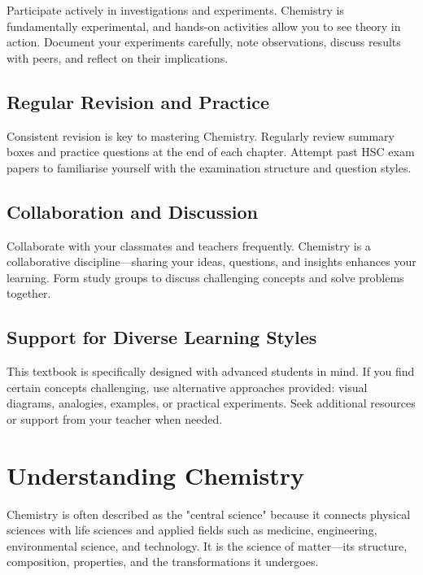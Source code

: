 Participate actively in investigations and experiments. Chemistry is fundamentally experimental, and hands-on activities allow you to see theory in action. Document your experiments carefully, note observations, discuss results with peers, and reflect on their implications.

\subsection{Regular Revision and Practice}
\FloatBarrier
\FloatBarrier
\FloatBarrier

Consistent revision is key to mastering Chemistry. Regularly review summary boxes and practice questions at the end of each chapter. Attempt past HSC exam papers to familiarise yourself with the examination structure and question styles.

\subsection{Collaboration and Discussion}
\FloatBarrier
\FloatBarrier
\FloatBarrier

Collaborate with your classmates and teachers frequently. Chemistry is a collaborative discipline—sharing your ideas, questions, and insights enhances your learning. Form study groups to discuss challenging concepts and solve problems together.

\subsection{Support for Diverse Learning Styles}
\FloatBarrier
\FloatBarrier
\FloatBarrier

This textbook is specifically designed with advanced students in mind. If you find certain concepts challenging, use alternative approaches provided: visual diagrams, analogies, examples, or practical experiments. Seek additional resources or support from your teacher when needed.

\section{Understanding Chemistry}
\FloatBarrier
\FloatBarrier
\FloatBarrier

Chemistry is often described as the "central science" because it connects physical sciences with life sciences and applied fields such as medicine, engineering, environmental science, and technology. It is the science of matter—its structure, composition, properties, and the transformations it undergoes.

